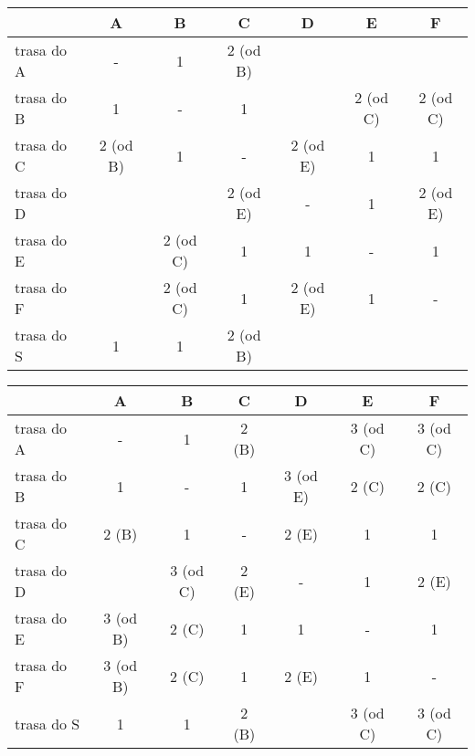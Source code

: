 \documentclass[a4paper, oneside]{article}
\begin{document}
\begin{description}
    \begin{table}[H]
    \centering
    \begin{tabular}{|l|c|c|c|c|c|c|}
    \hline
    & \textbf{A} & \textbf{B} 
    & \textbf{C} & \textbf{D} 
    & \textbf{E} & \textbf{F} \\ \hline\hline
    trasa do A & -         & 1         & 2 \cellcolor{green!10}(od B) &           &           &   
    \\ \hline
    trasa do B & 1         & -         & 1         &           & 2 \cellcolor{green!10}(od C) & 2 \cellcolor{green!10}(od C) 
    \\ \hline
    trasa do C & 2 \cellcolor{green!10}(od B) & 1         & -         & 2 \cellcolor{green!10}(od E) & 1         & 1 
    \\ \hline
    trasa do D &           &           & 2 \cellcolor{green!10}(od E) & -         & 1         & 2 \cellcolor{green!10}(od E) 
    \\ \hline
    trasa do E &           & 2 \cellcolor{green!10}(od C) & 1         & 1         & -         & 1 
    \\ \hline
    trasa do F &           & 2 \cellcolor{green!10}(od C) & 1         & 2 \cellcolor{green!10}(od E) & 1         & - 
    \\ \hline
    trasa do S & 1         & 1         & 2 \cellcolor{green!10}(od B) &           &           &   
    \\ \hline
    \end{tabular}
    \end{table}

    \begin{table}[H]
    \centering
    \begin{tabular}{|l|c|c|c|c|c|c|}
    \hline
    & \textbf{A} & \textbf{B} 
    & \textbf{C} & \textbf{D} 
    & \textbf{E} & \textbf{F} \\ \hline\hline
    trasa do A & -         & 1         & 2 (B)    &           & 3 \cellcolor{green!10}(od C) & 3 \cellcolor{green!10}(od C) \\ \hline
    trasa do B & 1         & -         & 1         & 3 \cellcolor{green!10}(od E) & 2 (C)       & 2 (C)      \\ \hline
    trasa do C & 2 (B)     & 1         & -         & 2   (E)    & 1         & 1         \\ \hline
    trasa do D &           & 3 \cellcolor{green!10}(od C) & 2  (E)     & -         & 1         & 2   (E)    \\ \hline
    trasa do E & 3 \cellcolor{green!10}(od B) & 2 (C)      & 1         & 1         & -         & 1         \\ \hline
    trasa do F & 3 \cellcolor{green!10}(od B) & 2 (C)      & 1         & 2 (E)      & 1         & -         \\ \hline
    trasa do S & 1         & 1         & 2    (B)  &           & 3 \cellcolor{green!10}(od C) & 3 \cellcolor{green!10}(od C) \\ \hline
    \end{tabular}
    \end{table}


\end{description}
\end{document}
